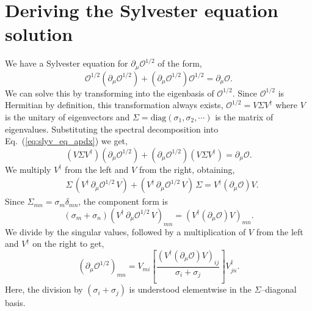 \documentclass[galley,aps,pra,10pt,amsmath,amssymb,
    superscriptaddress,nofootinbib,longbibliography]{revtex4-2}
\newcounter{comm}
\newcommand{\eq}[1]{Eq.~(\ref{eq:#1})}
\begin{document}
\section{Deriving the Sylvester equation solution}
\label{apdx:sylvester}
We have a Sylvester equation for $\partial_\mu \mathcal{O}^{1/2}$ of the form,
\begin{equation}
    \label{eq:slyv_eq_apdx}
    \mathcal{O}^{1/2}(\partial_\mu \mathcal{O}^{1/2})+(\partial_\mu \mathcal{O}^{1/2})\mathcal{O}^{1/2}=\partial_\mu \mathcal{O}.
\end{equation}
We can solve this by transforming into the eigenbasis of $\mathcal{O}^{1/2}$. Since $\mathcal{O}^{1/2}$ is Hermitian by definition, this transformation always exists, $\mathcal{O}^{1/2}= V \Sigma V^{\dagger}$ where $V$ is the unitary of eigenvectors and $\Sigma = \textrm{diag}(\sigma_1, \sigma_2, \cdots )$ is the matrix of eigenvalues. Substituting the spectral decomposition into \eq{slyv_eq_apdx} we get, 
\begin{equation}
\label{eq:eigdecomp}
    (V\Sigma V^{\dagger})(\partial_\mu \mathcal{O}^{1/2}) + (\partial_\mu \mathcal{O}^{1/2}) (V \Sigma V^{\dagger} ) = \partial_\mu \mathcal{O}.
\end{equation}
We multiply $V^{\dagger}$ from the left and $V$ from the right, obtaining,
\begin{align}
    \label{eq:sylv_step_2}
    &\Sigma \,(V^{\dagger}\,\partial_\mu \mathcal{O}^{1/2}\,V)
    + (V^{\dagger}\,\partial_\mu \mathcal{O}^{1/2}\,V)\,\Sigma = 
   V^{\dagger} (\partial_\mu \mathcal{O})V.
\end{align}
Since $\Sigma_{mn} = \sigma_m\delta_{mn}$, the component form is
\begin{equation}
\label{eq:Pprime_comp}
    (\sigma_m+\sigma_n)
    (V^{\dagger}\,\partial_\mu \mathcal{O}^{1/2}\,V)_{mn}
    = \left( V^{\dagger} (\partial_\mu \mathcal{O})V \right)_{mn}.
\end{equation}
We divide by the singular values, followed by a multiplication of $V$ from the left and $V^{\dagger}$ on the right to get,
\begin{equation}
\label{eq:sylv_sol}
    (\partial_\mu \mathcal{O}^{1/2})_{mn}
    =
    V_{mi}
    \left[ 
    \frac{
        \left(
           V^{\dagger} (\partial_\mu \mathcal{O})V
        \right)_{ij}
    }{
        \sigma_i+\sigma_j
    }\right] V^{\dagger}_{jn}.
\end{equation}
Here, the division by $(\sigma_i+\sigma_j)$ is understood elementwise in the $\Sigma$–diagonal basis.


\end{document}
